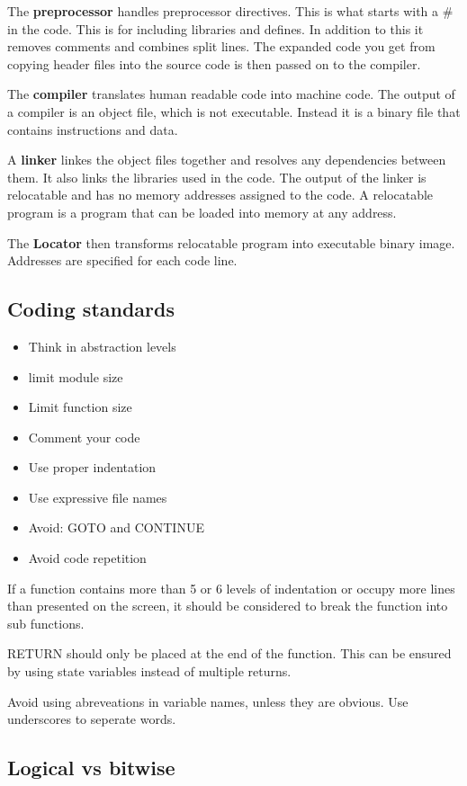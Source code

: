 The \textbf{preprocessor} handles preprocessor directives. This is what
starts with a \# in the code. This is for including libraries
and defines. In addition to this it removes comments and combines
split lines. The expanded code you get from copying header files
into the source code is then passed on to the compiler.

The \textbf{compiler} translates human readable code into machine code.
The output of a compiler is an object file, which is not executable.
Instead it is a binary file that contains instructions and data.

A \textbf{linker} linkes the object files together and resolves
any dependencies between them. It also links the libraries used
in the code. The output of the linker is relocatable and has no memory
addresses assigned to the code.
A relocatable program is a program that can be loaded into memory
at any address.

The \textbf{Locator} then transforms relocatable program into executable
binary image. Addresses are specified for each code line.


\subsection{Coding standards}
\begin{itemize}
	\item Think in abstraction levels
	\item limit module size
	\item Limit function size
	\item Comment your code
	\item Use proper indentation
	\item Use expressive file names
	\item Avoid: GOTO and CONTINUE
	\item Avoid code repetition
\end{itemize}

If a function contains more than 5 or 6 levels of indentation
or occupy more lines than presented on the screen, it should
be considered to break the function into sub functions.


RETURN should only be placed at the end of the function.
This can be ensured by using state variables instead of multiple
returns.

Avoid using abreveations in variable names, unless they are obvious.
Use underscores to seperate words.


\subsection{Logical vs bitwise}

